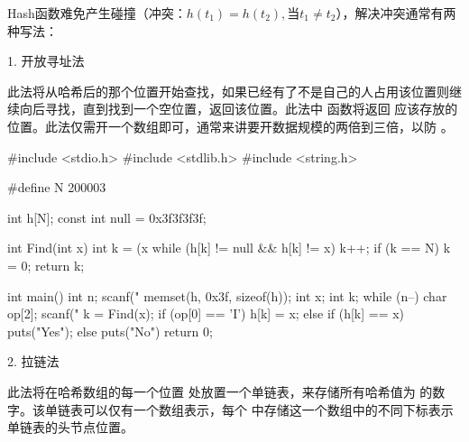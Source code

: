 Hash函数难免产生碰撞（冲突：$h(t_1) = h(t_2), \text{当} t_1 \neq t_2$），解决冲突通常有两种写法：

1. 开放寻址法

此法将从哈希后的那个位置开始查找，如果已经有了不是自己的人占用该位置则继续向后寻找，直到找到一个空位置，返回该位置。此法中  函数将返回  应该存放的位置。此法仅需开一个数组即可，通常来讲要开数据规模的两倍到三倍，以防 。

\begin{mycpptwocol}[开放寻址法]
    #include <stdio.h>
    #include <stdlib.h>
    #include <string.h>

    #define N 200003

    int h[N];
    const int null = 0x3f3f3f3f;

    int Find(int x) {
        int k = (x %
        while (h[k] != null && h[k] != x) {
            k++;
            if (k == N) {
                k = 0;
            }
        }
        return k;
    }

    int main() {
        int n;
        scanf("%
        memset(h, 0x3f, sizeof(h));
        int x;
        int k;
        while (n--) {
            char op[2];
            scanf("%
            k = Find(x);
            if (op[0] == 'I') {
                h[k] = x;
            } else {
                if (h[k] == x) {
                    puts("Yes");
                } else {
                    puts("No")
                }
            }
        }
        return 0;
    }
\end{mycpptwocol}

2. 拉链法

此法将在哈希数组的每一个位置  处放置一个单链表，来存储所有哈希值为  的数字。该单链表可以仅有一个数组表示，每个  中存储这一个数组中的不同下标表示单链表的头节点位置。

